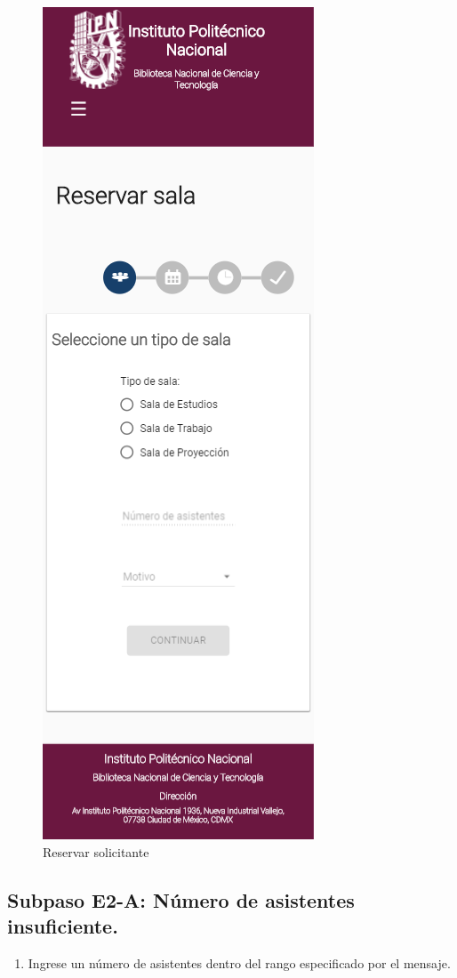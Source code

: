 \begin{figure}[hbtp]
		
		\includegraphics[scale=0.3]{images/InterfazMovil/IUGS02_reservarsolicitante.png}
		\caption{Reservar solicitante}
	\end{figure}
	

\subsection{Subpaso E2-A: Número de asistentes insuficiente.}
\begin{enumerate}
	\item Ingrese un número de asistentes dentro del rango
		especificado por el mensaje.
\end{enumerate}

